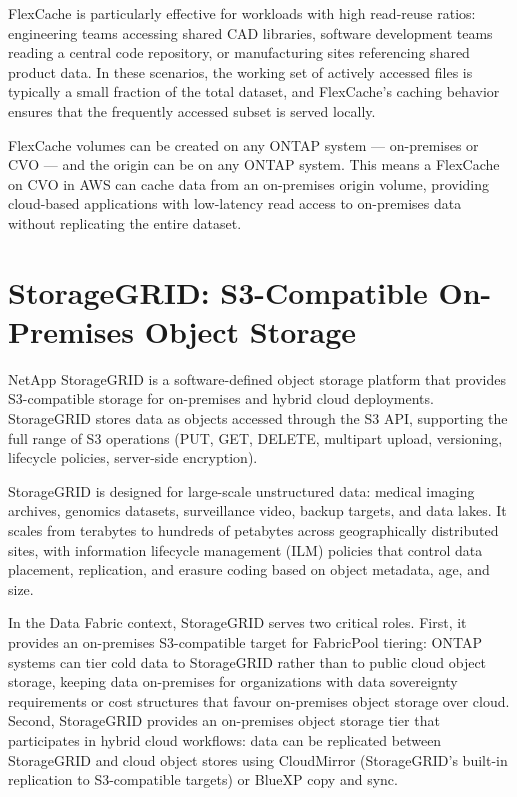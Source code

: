 FlexCache is particularly effective for workloads with high read-reuse ratios: engineering teams accessing shared CAD libraries, software development teams reading a central code repository, or manufacturing sites referencing shared product data. In these scenarios, the working set of actively accessed files is typically a small fraction of the total dataset, and FlexCache's caching behavior ensures that the frequently accessed subset is served locally.

FlexCache volumes can be created on any ONTAP system --- on-premises or CVO --- and the origin can be on any ONTAP system. This means a FlexCache on CVO in AWS can cache data from an on-premises origin volume, providing cloud-based applications with low-latency read access to on-premises data without replicating the entire dataset.

\section{StorageGRID: S3-Compatible On-Premises Object Storage}

NetApp StorageGRID is a software-defined object storage platform that provides S3-compatible storage for on-premises and hybrid cloud deployments. StorageGRID stores data as objects accessed through the S3 API, supporting the full range of S3 operations (PUT, GET, DELETE, multipart upload, versioning, lifecycle policies, server-side encryption).

StorageGRID is designed for large-scale unstructured data: medical imaging archives, genomics datasets, surveillance video, backup targets, and data lakes. It scales from terabytes to hundreds of petabytes across geographically distributed sites, with information lifecycle management (ILM) policies that control data placement, replication, and erasure coding based on object metadata, age, and size.

In the Data Fabric context, StorageGRID serves two critical roles. First, it provides an on-premises S3-compatible target for FabricPool tiering: ONTAP systems can tier cold data to StorageGRID rather than to public cloud object storage, keeping data on-premises for organizations with data sovereignty requirements or cost structures that favour on-premises object storage over cloud. Second, StorageGRID provides an on-premises object storage tier that participates in hybrid cloud workflows: data can be replicated between StorageGRID and cloud object stores using CloudMirror (StorageGRID's built-in replication to S3-compatible targets) or BlueXP copy and sync.

